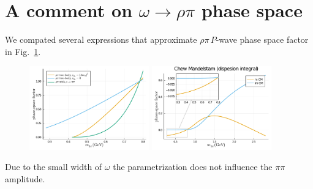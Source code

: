 \documentclass[aps,prd,superscriptaddress,onecolumn,nofootinbib,preprintnumbers,notitlepage]{revtex4-1}
\newcommand{\CM}{\mathrm{CM}}
\newcommand{\diff}{\mathrm{d}}
\begin{document}
\section{A comment on $\omega\to\rho\pi$ phase space}
We compated several expressions that approximate $\rho\pi\,P$-wave
phase space factor in Fig.~\ref{fig:rhopi.ph.sp}.
\begin{figure}
  \includegraphics[width=0.46\textwidth]{phase_space_tb_vs_qtb.pdf}
  \includegraphics[width=0.46\textwidth]{qtb_dispersive_term.pdf}
  \caption{}
  \label{fig:rhopi.ph.sp}
\end{figure}
Due to the small width of $\omega$ the parametrization does not influence
the $\pi\pi$ amplitude.


\end{document}
